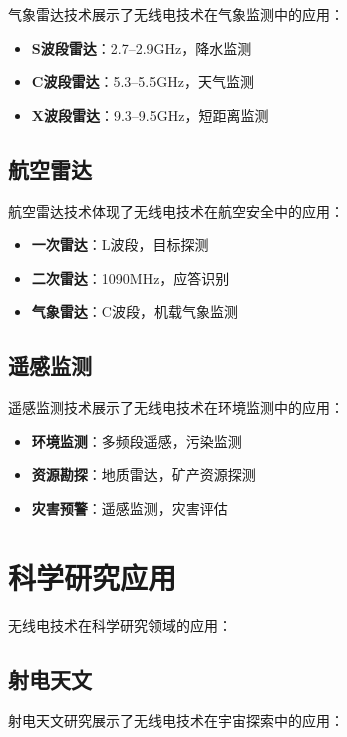 \documentclass[12pt,UTF8]{ctexbook}
\begin{document}
气象雷达技术展示了无线电技术在气象监测中的应用：

\begin{itemize}[leftmargin=3.5em]
    \item \textbf{S波段雷达}：2.7--2.9GHz，降水监测
    \item \textbf{C波段雷达}：5.3--5.5GHz，天气监测
    \item \textbf{X波段雷达}：9.3--9.5GHz，短距离监测
\end{itemize}

\subsection{航空雷达}

航空雷达技术体现了无线电技术在航空安全中的应用：

\begin{itemize}[leftmargin=3.5em]
    \item \textbf{一次雷达}：L波段，目标探测
    \item \textbf{二次雷达}：1090MHz，应答识别
    \item \textbf{气象雷达}：C波段，机载气象监测
\end{itemize}

\subsection{遥感监测}

遥感监测技术展示了无线电技术在环境监测中的应用：

\begin{itemize}[leftmargin=3.5em]
    \item \textbf{环境监测}：多频段遥感，污染监测
    \item \textbf{资源勘探}：地质雷达，矿产资源探测
    \item \textbf{灾害预警}：遥感监测，灾害评估
\end{itemize}

\section{科学研究应用}

无线电技术在科学研究领域的应用：

\subsection{射电天文}

射电天文研究展示了无线电技术在宇宙探索中的应用：
\end{document}
